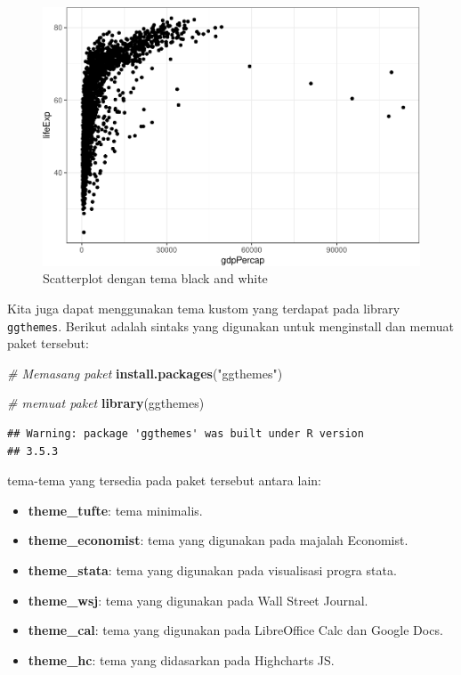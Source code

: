 \documentclass[]{book}
\newenvironment{Shaded}{\begin{snugshade}}{\end{snugshade}}
\newcommand{\KeywordTok}[1]{\textcolor[rgb]{0.13,0.29,0.53}{\textbf{#1}}}
\newcommand{\StringTok}[1]{\textcolor[rgb]{0.31,0.60,0.02}{#1}}
\newcommand{\CommentTok}[1]{\textcolor[rgb]{0.56,0.35,0.01}{\textit{#1}}}
\newcommand{\NormalTok}[1]{#1}
\providecommand{\tightlist}{%
  \setlength{\itemsep}{0pt}\setlength{\parskip}{0pt}}
\begin{document}
\begin{figure}

{\centering \includegraphics[width=0.7\linewidth]{EnvStat_files/figure-latex/ggtema-1} 

}

\caption{Scatterplot dengan tema black and white}\label{fig:ggtema}
\end{figure}

Kita juga dapat menggunakan tema kustom yang terdapat pada library
\texttt{ggthemes}. Berikut adalah sintaks yang digunakan untuk
menginstall dan memuat paket tersebut:

\begin{Shaded}
\begin{Highlighting}[]
\CommentTok{# Memasang paket}
\KeywordTok{install.packages}\NormalTok{(}\StringTok{"ggthemes"}\NormalTok{)}
\end{Highlighting}
\end{Shaded}

\begin{Shaded}
\begin{Highlighting}[]
\CommentTok{# memuat paket}
\KeywordTok{library}\NormalTok{(ggthemes)}
\end{Highlighting}
\end{Shaded}

\begin{verbatim}
## Warning: package 'ggthemes' was built under R version
## 3.5.3
\end{verbatim}

tema-tema yang tersedia pada paket tersebut antara lain:

\begin{itemize}
\tightlist
\item
  \textbf{theme\_tufte}: tema minimalis.
\item
  \textbf{theme\_economist}: tema yang digunakan pada majalah Economist.
\item
  \textbf{theme\_stata}: tema yang digunakan pada visualisasi progra
  stata.
\item
  \textbf{theme\_wsj}: tema yang digunakan pada Wall Street Journal.
\item
  \textbf{theme\_cal}: tema yang digunakan pada LibreOffice Calc dan
  Google Docs.
\item
  \textbf{theme\_hc}: tema yang didasarkan pada Highcharts JS.
\end{itemize}
\end{document}
